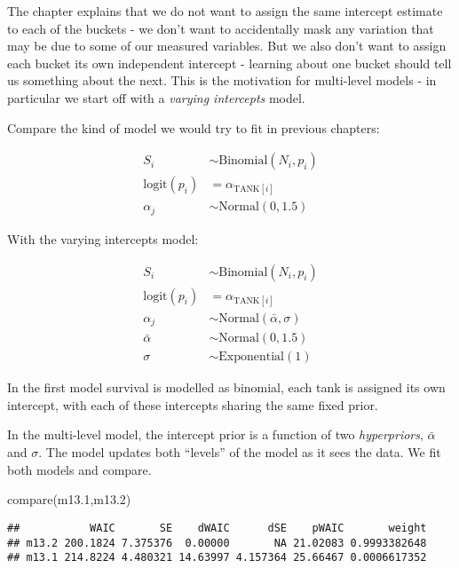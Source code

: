 \documentclass[
]{book}
\newenvironment{Shaded}{\begin{snugshade}}{\end{snugshade}}
\newcommand{\FloatTok}[1]{\textcolor[rgb]{0.00,0.00,0.81}{#1}}
\newcommand{\FunctionTok}[1]{\textcolor[rgb]{0.00,0.00,0.00}{#1}}
\newcommand{\NormalTok}[1]{#1}
\begin{document}
The chapter explains that we do not want to assign the same intercept estimate to each of the buckets - we don't want to accidentally mask any variation that may be due to some of our measured variables. But we also don't want to assign each bucket its own independent intercept - learning about one bucket should tell us something about the next. This is the motivation for multi-level models - in particular we start off with a \emph{varying intercepts} model.

Compare the kind of model we would try to fit in previous chapters:

\[
\begin{aligned}
S_i &\sim \text{Binomial}(N_i,p_i) \\
\text{logit}(p_i) &= \alpha_{\text{TANK}[i]} \\
\alpha_j &\sim \text{Normal}(0,1.5)
\end{aligned}
\]

With the varying intercepts model:

\[
\begin{aligned}
S_i &\sim \text{Binomial}(N_i,p_i) \\
\text{logit}(p_i) &= \alpha_{\text{TANK}[i]} \\
\alpha_j &\sim \text{Normal}(\bar{\alpha},\sigma) \\
\bar{\alpha} & \sim \text{Normal}(0,1.5) \\
\sigma &\sim \text{Exponential}(1)
\end{aligned}
\]

In the first model survival is modelled as binomial, each tank is assigned its own intercept, with each of these intercepts sharing the same fixed prior.

In the multi-level model, the intercept prior is a function of two \emph{hyperpriors}, \(\bar{\alpha}\) and \(\sigma\). The model updates both ``levels'' of the model as it sees the data. We fit both models and compare.

\begin{Shaded}
\begin{Highlighting}[]
\FunctionTok{compare}\NormalTok{(m13}\FloatTok{.1}\NormalTok{,m13}\FloatTok{.2}\NormalTok{)}
\end{Highlighting}
\end{Shaded}

\begin{verbatim}
##           WAIC       SE    dWAIC      dSE    pWAIC       weight
## m13.2 200.1824 7.375376  0.00000       NA 21.02083 0.9993382648
## m13.1 214.8224 4.480321 14.63997 4.157364 25.66467 0.0006617352
\end{verbatim}
\end{document}

